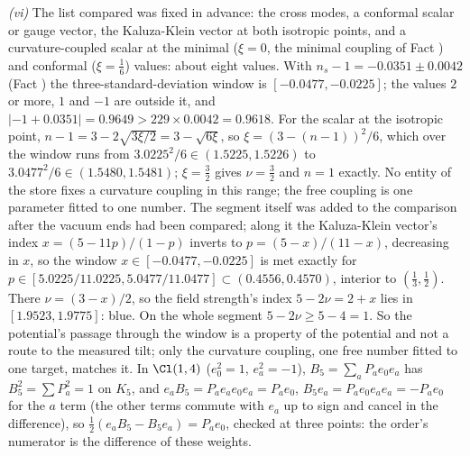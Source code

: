 \emph{(vi)} The list compared was fixed in advance: the cross modes, a conformal scalar or gauge vector, the Kaluza-Klein vector at both isotropic points, and a curvature-coupled scalar at the minimal ($\xi = 0$, the minimal coupling of Fact ) and conformal ($\xi = \tfrac16$) values: about eight values. With $n_{s} - 1 = -0.0351 \pm 0.0042$ (Fact ) the three-standard-deviation window is $[-0.0477, -0.0225]$; the values $2$ or more, $1$ and $-1$ are outside it, and $|-1 + 0.0351| = 0.9649 > 229 \times 0.0042 = 0.9618$. For the scalar at the isotropic point, $n - 1 = 3 - 2\sqrt{3\xi/2} = 3 - \sqrt{6\xi}$, so $\xi = (3 - (n - 1))^{2}/6$, which over the window runs from $3.0225^{2}/6 \in (1.5225, 1.5226)$ to $3.0477^{2}/6 \in (1.5480, 1.5481)$; $\xi = \tfrac32$ gives $\nu = \tfrac32$ and $n = 1$ exactly. No entity of the store fixes a curvature coupling in this range; the free coupling is one parameter fitted to one number. The segment itself was added to the comparison after the vacuum ends had been compared; along it the Kaluza-Klein vector's index $x = (5 - 11p)/(1 - p)$ inverts to $p = (5 - x)/(11 - x)$, decreasing in $x$, so the window $x \in [-0.0477, -0.0225]$ is met exactly for $p \in [5.0225/11.0225, 5.0477/11.0477] \subset (0.4556, 0.4570)$, interior to $(\tfrac13, \tfrac12)$. There $\nu = (3 - x)/2$, so the field strength's index $5 - 2\nu = 2 + x$ lies in $[1.9523, 1.9775]$: blue. On the whole segment $5 - 2\nu \ge 5 - 4 = 1$. So the potential's passage through the window is a property of the potential and not a route to the measured tilt; only the curvature coupling, one free number fitted to one target, matches it. In $\Cl(1,4)$ ($e_{0}^{2} = 1$, $e_{a}^{2} = -1$), $B_{5} = \sum_{a}P_{a}e_{0}e_{a}$ has $B_{5}^{2} = \sum P_{a}^{2} = 1$ on $K_{5}$, and $e_{a}B_{5} = P_{a}e_{a}e_{0}e_{a} = P_{a}e_{0}$, $B_{5}e_{a} = P_{a}e_{0}e_{a}e_{a} = -P_{a}e_{0}$ for the $a$ term (the other terms commute with $e_{a}$ up to sign and cancel in the difference), so $\tfrac12(e_{a}B_{5} - B_{5}e_{a}) = P_{a}e_{0}$, checked at three points: the order's numerator is the difference of these weights.
